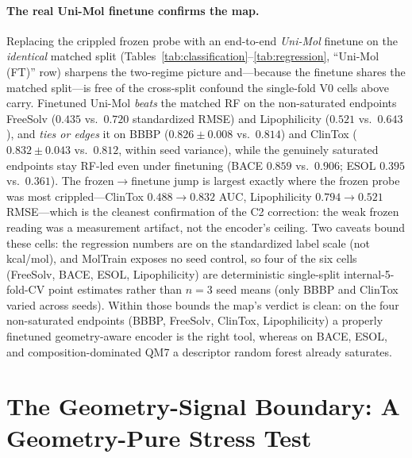 \documentclass[sigconf,nonacm,anonymous,review]{acmart}
\begin{document}
\paragraph{The real Uni-Mol finetune confirms the map.}
Replacing the crippled frozen probe with an end-to-end \emph{Uni-Mol}
finetune on the \emph{identical} matched split (Tables~\ref{tab:classification}--\ref{tab:regression},
``Uni-Mol (FT)'' row) sharpens the two-regime picture and---because the
finetune shares the matched split---is free of the cross-split confound the
single-fold V0 cells above carry. Finetuned Uni-Mol \emph{beats} the matched
RF on the non-saturated endpoints FreeSolv ($0.435$ vs.\ $0.720$ standardized
RMSE) and Lipophilicity ($0.521$ vs.\ $0.643$), and \emph{ties or edges} it
on BBBP ($0.826{\pm}0.008$ vs.\ $0.814$) and ClinTox ($0.832{\pm}0.043$ vs.\
$0.812$, within seed variance), while the genuinely saturated endpoints stay
RF-led even under finetuning (BACE $0.859$ vs.\ $0.906$; ESOL $0.395$ vs.\
$0.361$). The frozen$\to$finetune jump is largest exactly where the frozen
probe was most crippled---ClinTox $0.488\!\rightarrow\!0.832$ AUC,
Lipophilicity $0.794\!\rightarrow\!0.521$ RMSE---which is the cleanest
confirmation of the C2 correction: the weak frozen reading was a measurement
artifact, not the encoder's ceiling. Two caveats bound these cells: the
regression numbers are on the standardized label scale (not kcal/mol), and
MolTrain exposes no seed control, so four of the six cells (FreeSolv, BACE,
ESOL, Lipophilicity) are deterministic single-split internal-5-fold-CV point
estimates rather than $n{=}3$ seed means (only BBBP and ClinTox varied across
seeds). Within those bounds the map's verdict is clean: on the four
non-saturated endpoints (BBBP, FreeSolv, ClinTox, Lipophilicity) a properly
finetuned geometry-aware encoder is the right tool, whereas on BACE, ESOL,
and composition-dominated QM7 a descriptor random forest already saturates.

\section{The Geometry-Signal Boundary: A Geometry-Pure Stress Test}
\label{sec:dft}
\end{document}
